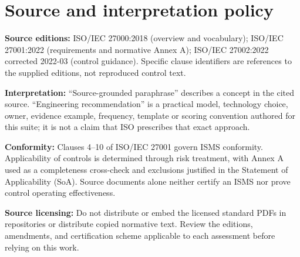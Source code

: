 \documentclass[11pt,letterpaper]{article}
\begin{document}
\clearpage\section*{Source and interpretation policy}
\textbf{Source editions:} ISO/IEC 27000:2018 (overview and vocabulary); ISO/IEC 27001:2022 (requirements and normative Annex A); ISO/IEC 27002:2022 corrected 2022-03 (control guidance). Specific clause identifiers are references to the supplied editions, not reproduced control text.\par
\textbf{Interpretation:} ``Source-grounded paraphrase'' describes a concept in the cited source. ``Engineering recommendation'' is a practical model, technology choice, owner, evidence example, frequency, template or scoring convention authored for this suite; it is not a claim that ISO prescribes that exact approach.\par
\textbf{Conformity:} Clauses 4--10 of ISO/IEC 27001 govern ISMS conformity. Applicability of controls is determined through risk treatment, with Annex A used as a completeness cross-check and exclusions justified in the Statement of Applicability (SoA). Source documents alone neither certify an ISMS nor prove control operating effectiveness.\par
\textbf{Source licensing:} Do not distribute or embed the licensed standard PDFs in repositories or distribute copied normative text. Review the editions, amendments, and certification scheme applicable to each assessment before relying on this work.\par
\end{document}
